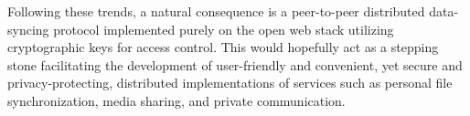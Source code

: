 Following these trends, a natural consequence is a peer-to-peer distributed data-syncing protocol implemented purely on the open web stack utilizing cryptographic keys for access control. This would hopefully act as a stepping stone facilitating the development of user-friendly and convenient, yet secure and privacy-protecting, distributed implementations of services such as personal file synchronization, media sharing, and private communication.
